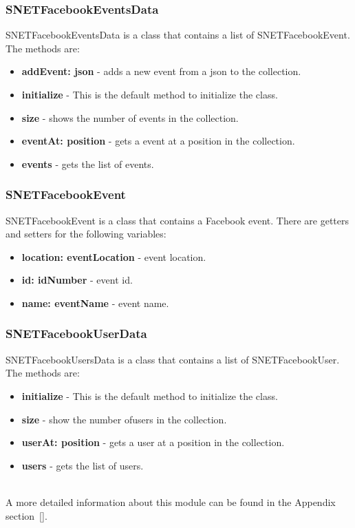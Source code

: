 \subsubsection{SNETFacebookEventsData}
\label{sec-1-5-12}
SNETFacebookEventsData is a class that contains a list of SNETFacebookEvent. The methods are:
\begin{itemize}
\item \textbf{addEvent: json} - adds a new event from a json to the collection.
\item \textbf{initialize} - This is the default method to initialize the class.
\item \textbf{size} - shows the number of events in the collection.
\item \textbf{eventAt: position} - gets a event at a position in the collection.
\item \textbf{events} - gets the list of events.
\end{itemize}


\subsubsection{SNETFacebookEvent}
\label{sec-1-5-13}
SNETFacebookEvent is a class that contains a Facebook event. There are getters and setters for the following variables:
\begin{itemize}
\item \textbf{location: eventLocation} - event location.
\item \textbf{id: idNumber} - event id.
\item \textbf{name: eventName} - event name.
\end{itemize}


\subsubsection{SNETFacebookUserData}
\label{sec-1-5-14}
SNETFacebookUsersData is a class that contains a list of SNETFacebookUser. The methods are:
\begin{itemize}
\item \textbf{initialize} - This is the default method to initialize the class.
\item \textbf{size} - show the number ofusers in the collection.
\item \textbf{userAt: position} - gets a user at a position in the collection.
\item \textbf{users} - gets the list of users.
\end{itemize}
\\
A more detailed information about this module can be found in the Appendix section~\ref{}.

